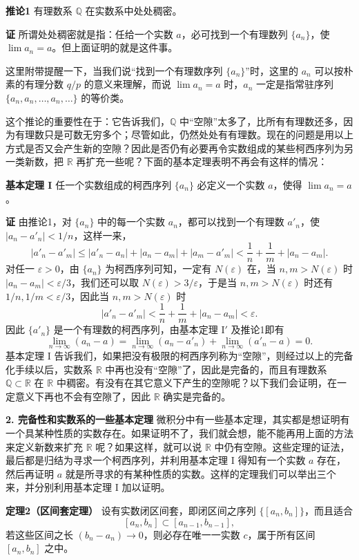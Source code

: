 \noindent\textbf{推论1}\quad
有理数系 $\mathbb Q$ 在实数系中处处稠密。

\noindent\textbf{证}\quad
所谓处处稠密就是指：任给一个实数 $a$，必可找到一个有理数列 $\{a_n\}$，使 $\lim a_n=a$。但上面证明的就是这件事。

这里附带提醒一下，当我们说“找到一个有理数序列 $\{a_n\}$”时，这里的 $a_n$ 可以按朴素的有理分数 $q/p$ 的意义来理解，而说 $\lim a_n=a$ 时，$a_n$ 一定是指常驻序列 $\{a_n,a_n,\ldots,a_n,\ldots\}$ 的等价类。

这个推论的重要性在于：它告诉我们，$\mathbb Q$ 中“空隙”太多了，比所有有理数还多，因为有理数只是可数无穷多个；尽管如此，仍然处处有有理数。现在的问题是用以上方式是否又会产生新的空隙？因此是否仍有必要再令实数组成的某些柯西序列为另一类新数，把 $\mathbb R$ 再扩充一些呢？下面的基本定理表明不再会有这样的情况：

\noindent\textbf{基本定理 I}\quad
任一个实数组成的柯西序列 $\{a_n\}$ 必定义一个实数 $a$，使得 $\lim a_n=a$。

\noindent\textbf{证}\quad
由推论1，对 $\{a_n\}$ 中的每一个实数 $a_n$，都可以找到一个有理数 $a'_n$，使 $|a_n-a'_n|<1/n$，这样一来，
\[
 |a'_n-a'_m|\le |a'_n-a_n|+|a_n-a_m|+|a_m-a'_m|
 <\frac1n+\frac1m+|a_n-a_m|.
\]
对任一 $\varepsilon>0$，由 $\{a_n\}$ 为柯西序列可知，一定有 $N(\varepsilon)$ 在，当 $n,m>N(\varepsilon)$ 时 $|a_n-a_m|<\varepsilon/3$，我们还可以取 $N(\varepsilon)>3/\varepsilon$，于是当 $n,m>N(\varepsilon)$ 时还有 $1/n,1/m<\varepsilon/3$，因此当 $n,m>N(\varepsilon)$ 时
\[
 |a'_n-a'_m|<\frac1n+\frac1m+|a_n-a_m|<\varepsilon.
\]
因此 $\{a'_n\}$ 是一个有理数的柯西序列，由基本定理 I$'$ 及推论1即有
\[
 \lim_{n\to\infty}(a_n-a)
 =\lim_{n\to\infty}(a_n-a'_n)+\lim_{n\to\infty}(a'_n-a)=0.
\]
基本定理 I 告诉我们，如果把没有极限的柯西序列称为“空隙”，则经过以上的完备化手续以后，实数系 $\mathbb R$ 中再也没有“空隙”了，因此是完备的，而且有理数系 $\mathbb Q\subset\mathbb R$ 在 $\mathbb R$ 中稠密。有没有在其它意义下产生的空隙呢？以下我们会证明，在一定意义下再也不会有空隙了，因此 $\mathbb R$ 确实是完备的。

\noindent\textbf{2. 完备性和实数系的一些基本定理}\quad
微积分中有一些基本定理，其实都是想证明有一个具某种性质的实数存在。如果证明不了，我们就会想，能不能再用上面的方法来定义新数来扩充 $\mathbb R$ 呢？如果这样，就可以说 $\mathbb R$ 中仍有空隙。这些定理的证法，最后都是归结为寻求一个柯西序列，并利用基本定理 I 得知有一个实数 $a$ 存在，然后再证明 $a$ 就是所寻求的有某种性质的实数。这样的定理我们可以举出三个来，并分别利用基本定理 I 加以证明。

\noindent\textbf{定理2（区间套定理）}\quad
设有实数闭区间套，即闭区间之序列 $\{[a_n,b_n]\}$，而且适合
\[
 [a_n,b_n]\subset[a_{n-1},b_{n-1}],
\]
若这些区间之长 $(b_n-a_n)\to0$，则必存在唯一一实数 $c$，属于所有区间 $[a_n,b_n]$ 之中。

